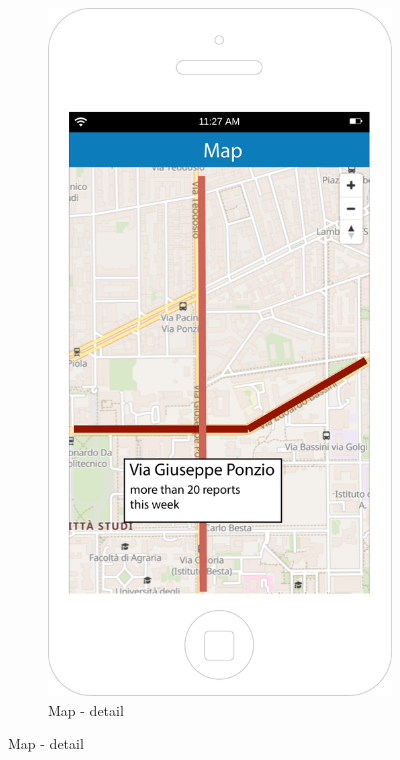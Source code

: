 \documentclass[12pt,a4paper]{report}
\begin{document}
\begin{figure}
		\begin{subfigure}{0.5\textwidth}
			\includegraphics[scale=0.25, center]{Map-detail}
			\caption{Map - detail}
			\label{fig:subim2}
		\end{subfigure}
		\end{figure}
\end{document}
